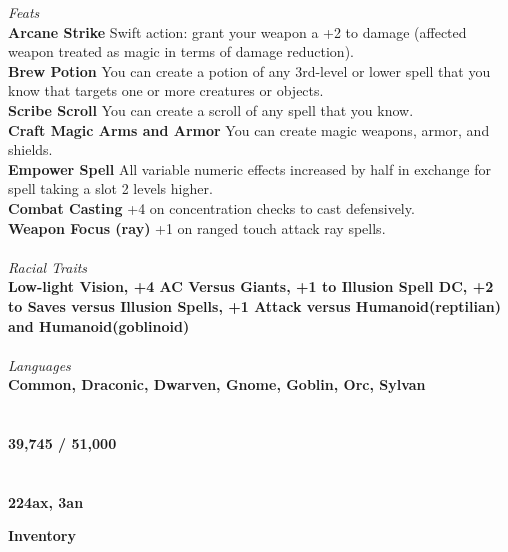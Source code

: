 \documentclass[letterpaper]{article}
\newcommand{\e}[1]{\emph{#1}}
\newcommand{\B}[1]{\textbf{#1}}
\begin{document}
\noindent\e{Feats} \\
\noindent\B{Arcane Strike} Swift action: grant your weapon a +2 to damage (affected weapon treated as magic in terms of damage reduction). \\
\noindent\B{Brew Potion} You can create a potion of any 3rd-level or lower spell that you know that targets one or more creatures or objects. \\
\noindent\B{Scribe Scroll} You can create a scroll of any spell that you know. \\
\noindent\B{Craft Magic Arms and Armor} You can create magic weapons, armor, and shields. \\
\noindent\B{Empower Spell} All variable numeric effects increased by half in exchange for spell taking a slot 2 levels higher. \\
\noindent\B{Combat Casting} +4 on concentration checks to cast defensively. \\
\noindent\B{Weapon Focus (ray)} +1 on ranged touch attack ray spells. \\
\\
\noindent\e{Racial Traits} \\
\B{Low-light Vision, +4 AC Versus Giants, +1 to Illusion Spell DC, +2 to Saves versus Illusion Spells, +1 Attack versus Humanoid(reptilian) and Humanoid(goblinoid)} \\
\\
\noindent\e{Languages} \\
\B{Common, Draconic, Dwarven, Gnome, Goblin, Orc, Sylvan} \\
\\
\noindent{\e{Experience}} \\
\B{39,745 / 51,000} \\
\\
\noindent{\e{Wealth}} \\
\B{224ax, 3an} \\

\pagebreak
\thispagestyle{empty}

\noindent \B{\huge{Inventory}} \\
\end{document}
